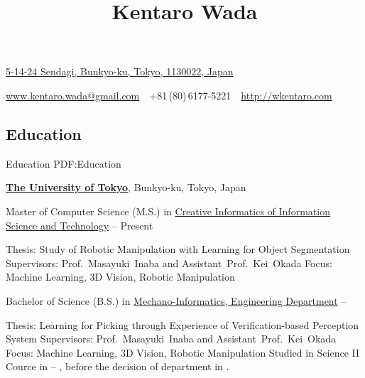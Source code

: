 \documentclass[letterpaper,MMMyyyy,nonstop]{simpleresumecv}
\newcommand{\CVAuthor}{Kentaro Wada}
\newcommand{\CVWebpage}{http://wkentaro.com}
\begin{document}

\title{\CVAuthor}

\begin{subtitle}
\href{https://www.google.co.jp/maps/place/5+Chome-14-24+Sendagi,+Bunky\%\%C5\%8D-ku,+T\%C5\%8Dky\%C5\%8D-to+113-0022/@35.7256436,139.7565051,17z/data=!3m1!4b1!4m5!3m4!1s0x60188dcec1ae4043:0x8a34261552288e81!8m2!3d35.7256436!4d139.7586938?hl=en}
{5-14-24 Sendagi, Bunkyo-ku, Tokyo, 1130022, Japan}
\par
\href{mailto:www.kentaro.wada@gmail.com}
{www.kentaro.wada@gmail.com}
\,\SubBulletSymbol\,
+81\,(80)\,6177-5221
\,\SubBulletSymbol\,
\href{\CVWebpage}
{\CVWebpage}
\end{subtitle}

\begin{body}


\section
{Education}
{Education}
{PDF:Education}

\href{http://www.u-tokyo.ac.jp/en/index.html}
{\textbf{The University of Tokyo}},
Bunkyo-ku, Tokyo, Japan

\GapNoBreak
\BulletItem
Master of Computer Science (M.S.) in
\href{http://www.i.u-tokyo.ac.jp/edu/course/ci/aim_e.shtml}
{Creative Informatics of Information Science and Technology}
\hfill
{} --
Present
\begin{detail}
\SubBulletItem
Thesis:
Study of Robotic Manipulation with Learning for Object Segmentation
\SubBulletItem
Supervisors:
Prof.~Masayuki~Inaba and Assistant~Prof.~Kei~Okada
\SubBulletItem
Focus:
Machine Learning, 3D Vision, Robotic Manipulation
\end{detail}

\GapNoBreak
\BulletItem
Bachelor of Science (B.S.) in
\href{http://www.kikaib.t.u-tokyo.ac.jp}
{Mechano-Informatics, Engineering Department}
\hfill
{} --
\begin{detail}
\SubBulletItem
Thesis:
Learning for Picking through Experience of Verification-based Perception System
\SubBulletItem
Supervisors:
Prof.~Masayuki~Inaba and Assistant~Prof.~Kei~Okada
\SubBulletItem
Focus:
Machine Learning, 3D Vision, Robotic Manipulation
\SubBulletItem
Studied in Science II Cource in  -- ,
before the decision of department in .
\end{detail}


\end{body}
\end{document}
